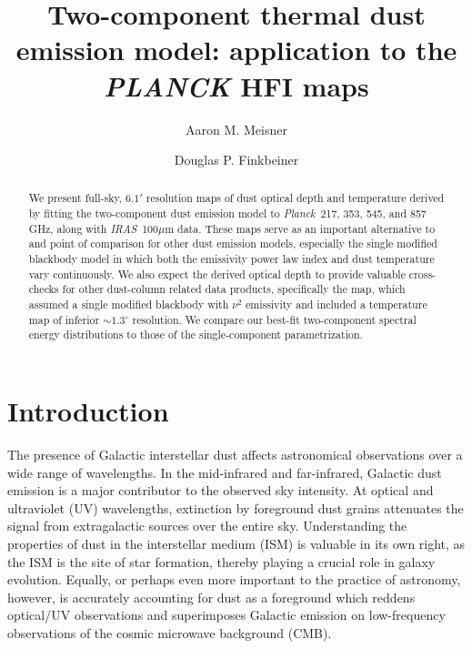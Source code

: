 \documentclass{emulateapj}
\newcommand{\IRAS}{{\it IRAS}}
\newcommand{\PLANCK}{{\it Planck}}
\begin{document}
\title{Two-component thermal dust emission model: application to the 
{\it PLANCK} HFI maps}
\author{Aaron M. Meisner}
\author{Douglas P. Finkbeiner}

\begin{abstract}
We present full-sky, $6.1'$ resolution maps of dust optical depth and 
temperature derived by fitting the \cite{FDS99} two-component dust emission 
model to \PLANCK~217, 353, 545, and 857 GHz, along with  \IRAS~100$\mu$m data. 
These maps serve as an important alternative to and point of comparison for 
other dust emission models, especially the single modified blackbody model in 
which both the emissivity power law index and dust temperature vary 
continuously. We also expect the derived optical depth to provide valuable 
cross-checks for other dust-column related data products, specifically the 
\cite{SFD} map, which assumed a single modified blackbody with $\nu^2$ 
emissivity and included a temperature map of inferior $\sim$$1.3^{\circ}$ 
resolution. We compare our best-fit two-component spectral energy distributions
to those of the \cite{planckdust} single-component parametrization.
\end{abstract}

\section{Introduction}
The presence of Galactic interstellar dust affects
astronomical observations over a wide range of wavelengths. In the mid-infrared
and far-infrared, Galactic dust emission is a major contributor
to the observed sky intensity. At optical and ultraviolet (UV) wavelengths, 
extinction by foreground dust grains attenuates the signal from extragalactic 
sources over the entire sky. Understanding the properties of dust in the 
interstellar medium (ISM) is valuable in its own right, as the ISM is the site 
of star formation, thereby playing a crucial role in galaxy evolution. Equally,
 or perhaps even more important to the practice of astronomy, however, is 
accurately accounting for dust as a foreground which reddens optical/UV 
observations and superimposes Galactic emission on low-frequency observations 
of the cosmic microwave background (CMB). 
\end{document}
